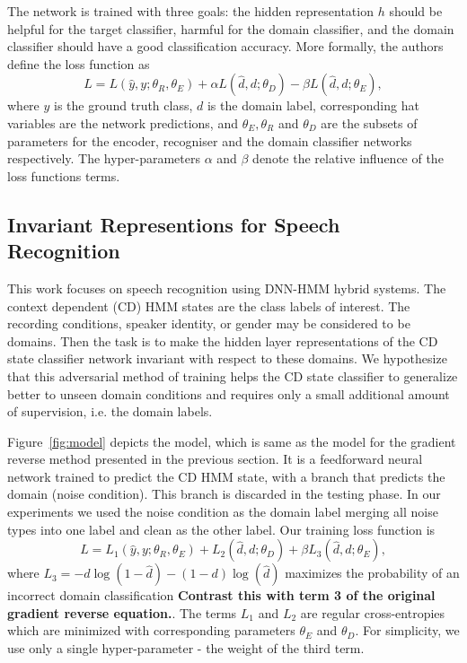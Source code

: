 \documentclass{article}
\begin{document}
    The network is trained with three goals: the hidden representation $h$ should
    be helpful for the target classifier, harmful for the domain classifier,
    and the domain classifier should have a good classification accuracy. More 
    formally, the authors define the loss function as
    \begin{equation}
        L = L(\hat{y}, y; \theta_R, \theta_E) + 
        \alpha L(\hat{d}, d; \theta_D) -
        \beta L(\hat{d}, d; \theta_E),
    \end{equation}
    where $y$ is the ground truth class, $d$ is the domain label, corresponding
    hat variables are the network predictions, and $\theta_E, \theta_R$ and $\theta_D$ are the subsets of  parameters for the encoder,
    recogniser and the domain classifier networks respectively. The hyper-parameters
    $\alpha$ and $\beta$ denote the relative influence of the loss functions terms.

\subsection{Invariant Representions for Speech Recognition}
\label{sec:invariant-speech}

This work focuses on speech recognition using DNN-HMM hybrid systems. The context dependent (CD) HMM states are the class labels of interest. The
recording conditions, speaker identity, or gender may be considered to be domains. Then the task is to make the hidden layer representations of the CD state classifier network 
invariant with respect to these domains. We hypothesize that this adversarial method of
training helps the CD state classifier to generalize better to unseen domain conditions and requires only a  
small additional amount of supervision, i.e. the domain labels.  

Figure~\ref{fig:model} depicts the model, which is same as the model for the gradient reverse method presented in the previous section. It is a feedforward neural network trained to predict the CD HMM state, with a branch that predicts the domain (noise condition). This branch is discarded in the testing phase. In our experiments we
used the noise condition as the domain label merging all noise types into one label
and clean as the other label. Our training loss function is
    \begin{equation}
        L = L_1(\hat{y}, y; \theta_R, \theta_E) + 
        L_2(\hat{d}, d; \theta_D) +
        \beta L_3(\hat{d}, d; \theta_E),
        \label{eq:cost}
    \end{equation}
where $L_3 = - d\log(1 - \hat{d}) - (1-d)\log(\hat{d})$ maximizes the probability
of an incorrect domain classification {\bf Contrast this with term 3 of the original gradient reverse equation.}. The terms $L_1$ and $L_2$ are 
regular cross-entropies which are minimized with corresponding parameters $\theta_E$ and $\theta_D$.
For simplicity, we use only a single hyper-parameter - the weight of the third term.
\end{document}
